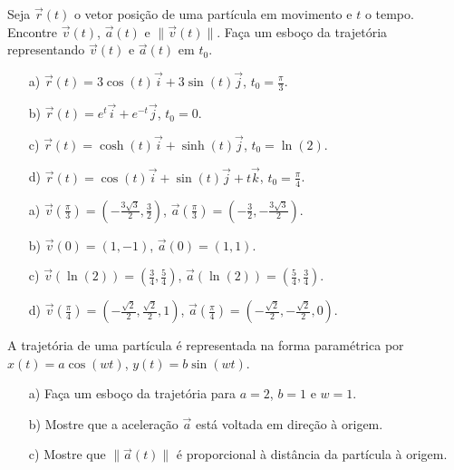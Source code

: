 \begin{exer}
 Seja $\vec{r}(t)$ o vetor posição de uma partícula em movimento e $t$ o tempo. Encontre $\vec{v}(t)$, $\vec{a}(t)$ e $\|\vec{v}(t)\|$. Faça um esboço da trajetória representando $\vec{v}(t)$ e $\vec{a}(t)$ em $t_0$.
 \begin{itemize}
  \item[a)]$\vec{r}(t)=3\cos(t)\vec{i}+3\sin(t)\vec{j}$, $t_0=\frac{\pi}{3}$.
    \item[b)]$\vec{r}(t)=e^t\vec{i}+e^{-t}\vec{j}$, $t_0=0$.
    \item[c)]$\vec{r}(t)=\cosh(t)\vec{i}+\sinh(t)\vec{j}$, $t_0=\ln(2)$.
        \item[d)]$\vec{r}(t)=\cos(t)\vec{i}+\sin(t)\vec{j}+t\vec{k}$, $t_0=\frac{\pi}{4}$.
 \end{itemize}
\end{exer}
\begin{resp}
 \begin{itemize}
  \item[a)]$\vec{v}\left(\frac{\pi}{3}\right)=\left(-\frac{3\sqrt{3}}{2},\frac{3}{2}\right)$, $\vec{a}\left(\frac{\pi}{3}\right)=\left(-\frac{3}{2},-\frac{3\sqrt{3}}{2}\right)$.
  \item[b)]$\vec{v}\left(0\right)=\left(1,-1\right)$, $\vec{a}\left(0\right)=\left(1,1\right)$.
    \item[c)]$\vec{v}\left(\ln(2)\right)=\left(\frac{3}{4},\frac{5}{4}\right)$, $\vec{a}\left(\ln(2)\right)=\left(\frac{5}{4},\frac{3}{4}\right)$.
  \item[d)]$\vec{v}\left(\frac{\pi}{4}\right)=\left(-\frac{\sqrt{2}}{2},\frac{\sqrt{2}}{2},1\right)$, $\vec{a}\left(\frac{\pi}{4}\right)=\left(-\frac{\sqrt{2}}{2},-\frac{\sqrt{2}}{2},0\right)$.
 \end{itemize}
\end{resp}
\begin{exer}
 A trajetória de uma partícula é representada na forma paramétrica por $x(t)=a\cos(wt)$, $y(t)=b\sin(wt)$.
 \begin{itemize}
  \item[a)] Faça um esboço da trajetória para $a=2$, $b=1$ e $w=1$.
  \item[b)] Mostre que a aceleração $\vec{a}$ está voltada em direção à origem.
  \item[c)] Mostre que $\|\vec{a}(t)\|$ é proporcional à distância da partícula à origem.
 \end{itemize}
 \end{exer}

